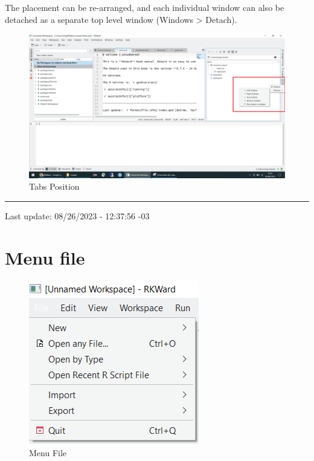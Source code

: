 \documentclass[
  letterpaper,
  DIV=11,
  numbers=noendperiod]{scrreprt}
\begin{document}
The placement can be re-arranged, and each individual window can also be
detached as a separate top level window (Windows \textgreater{} Detach).

\begin{figure}

{\centering \includegraphics{./images/main_tabs_position.png}

}

\caption{Tabs Position}

\end{figure}

\begin{center}\rule{0.5\linewidth}{0.5pt}\end{center}

Last update: 08/26/2023 - 12:37:56 -03


\hypertarget{menu-file}{%
\chapter{Menu file}\label{menu-file}}

\begin{figure}

{\centering \includegraphics{./images/menu_file/menu_file.png}

}

\caption{Menu File}

\end{figure}
\end{document}
